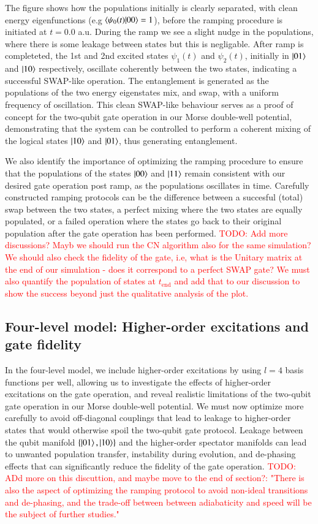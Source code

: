 \documentclass{subfiles}
\begin{document}
The figure shows how the populations initially is clearly separated, with clean energy eigenfunctions (e.g $\braket{\psi_0(t)|00} = 1$), before the ramping procedure is initiated at $t = 0.0$ a.u. During the ramp we see a slight nudge in the populations, where there is some leakage between states but this is negligable. After ramp is completeted, the 1st and 2nd excited states $\psi_1(t)$ and $\psi_2(t)$, initially in $\ket{01}$ and $\ket{10}$ respectively, oscillate coherently between the two states, indicating a successful SWAP-like operation. The entanglement is generated as the populations of the two energy eigenstates mix, and swap, with a uniform frequency of oscillation. This clean SWAP-like behaviour serves as a proof of concept for the two-qubit gate operation in our Morse double-well potential, demonstrating that the system can be controlled to perform a coherent mixing of the logical states $\ket{10}$ and $\ket{01}$, thus generating entanglement. 

We also identify the importance of optimizing the ramping procedure to ensure that the populations of the states $\ket{00}$ and $\ket{11}$ remain consistent with our desired gate operation post ramp, as the populations oscillates in time. Carefully constructed ramping protocols can be the difference between a succesful (total) swap between the two states, a perfect mixing where the two states are equally populated, or a failed operation where the states go back to their original population after the gate operation has been performed. 
\textcolor{red}{TODO: Add more discussions? Mayb we should run the CN algorithm also for the same simulation? We should also check the fidelity of the gate, i.e, what is the Unitary matrix at the end of our simulation - does it correspond to a perfect SWAP gate? We must also quantify the population of states at $t_{\text{end}}$ and add that to our discussion to show the success beyond just the qualitative analysis of the plot.}



\subsection{Four-level model: Higher-order excitations and gate fidelity}
In the four-level model, we include higher-order excitations by using $l=4$ basis functions per well, allowing us to investigate the effects of higher-order excitations on the gate operation, and reveal realistic limitations of the two-qubit gate operation in our Morse double-well potential. We must now optimize more carefully to avoid off-diagonal couplings that lead to leakage to higher-order states that would otherwise spoil the two-qubit gate protocol. Leakage between the qubit manifold $\{\ket{01}, \ket{10}\}$ and the higher-order spectator manifolds can lead to unwanted population transfer, instability during evolution, and de-phasing effects that can significantly reduce the fidelity of the gate
operation. \textcolor{red}{TODO: ADd more on this discuttion, and maybe move to the end of section?: "There is also the aspect of optimizing the ramping protocol to avoid non-ideal transitions and de-phasing, and the trade-off between between adiabaticity and speed will be the subject of further studies." }
\end{document}
